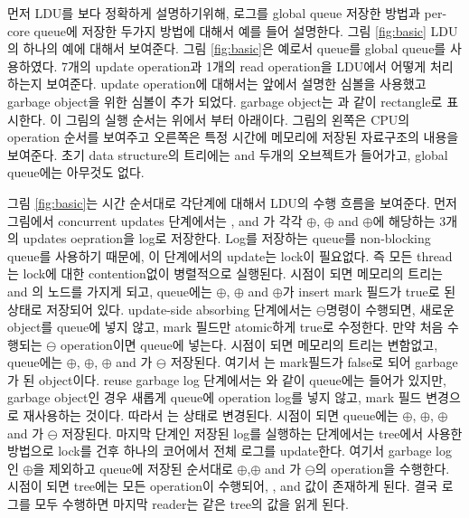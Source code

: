 %


\ifkor
먼저 LDU를 보다 정확하게 설명하기위해, 로그를 global queue 저장한 방법과 per-core queue에 저장한 두가지 방법에 대해서
예를 들어 설명한다. 
그림 \ref{fig:basic} LDU의 하나의 예에 대해서 보여준다. 그림 \ref{fig:basic}은 예로서 queue를 global
queue를 사용하였다. 
7개의 update operation과 1개의 read operation을 LDU에서 어떻게 처리하는지 보여준다.
update operation에 대해서는 앞에서 설명한 심볼을 사용했고 garbage object을 위한 심볼이 추가 되었다.
garbage object는 과 같이 rectangle로 표시한다. 
이 그림의 실행 순서는 위에서 부터 아래이다.
그림의 왼쪽은 CPU의 operation 순서를 보여주고 오른쪽은 특정 시간에 메모리에 저장된 자료구조의 내용을 보여준다.
초기 data structure의 트리에는  and  두개의 오브젝트가 들어가고, global
queue에는 아무것도 없다.

그림 \ref{fig:basic}는 시간 순서대로 각단계에 대해서 LDU의 수행 흐름을 보여준다.
먼저 그림에서 concurrent updates 단계에서는 ,  and 가 각각
$\oplus$, $\oplus$ and
$\oplus$에 해당하는 3개의 updates oepration을 log로 저장한다. 
Log를 저장하는 queue를 non-blocking queue를 사용하기 때문에, 이 단계에서의 update는 lock이 필요없다. 
즉 모든 thread는 lock에 대한 contention없이 병렬적으로 실행된다. 
 시점이 되면 메모리의 트리는  and 의 노드를 가지게 되고, queue에는 
$\oplus$, $\oplus$ and $\oplus$가 insert mark 필드가
true로 된 상태로 저장되어 있다. 
update-side absorbing 단계에서는  $\ominus$명령이 수행되면, 새로운 object를 queue에 넣지
않고, mark 필드만 atomic하게 true로 수정한다.  
만약 처음 수행되는 $\ominus$ operation이면 queue에 넣는다.
 시점이 되면 메모리의 트리는 변함없고, queue에는 
$\oplus$, $\oplus$, $\oplus$ and 가
$\ominus$ 저장된다. 여기서 는 mark필드가 false로 되어 garbage가 된 object이다.
reuse garbage log 단계에서는 와 같이 queue에는 들어가 있지만, garbage object인 경우 새롭게
queue에 operation log를 넣지 않고, mark 필드 변경으로 재사용하는 것이다. 
따라서 는  상태로 변경된다. 
 시점이 되면 queue에는 
$\oplus$, $\oplus$, $\oplus$ and 가
$\ominus$ 저장된다.
마지막 단계인 저장된 log를 실행하는 단계에서는 tree에서 사용한 방법으로 lock를 건후 하나의 코어에서 
전체 로그를 update한다. 여기서 garbage log인  $\oplus$을 제외하고 queue에 저장된 순서대로 
$\oplus$,$\oplus$ and 가 $\ominus$의 operation을
수행한다.  시점이 되면 tree에는 
모든 operation이 수행되어, ,  and  값이 존재하게 된다.
결국 로그를 모두 수행하면 마지막 reader는 같은 tree의 값을 읽게 된다. 

